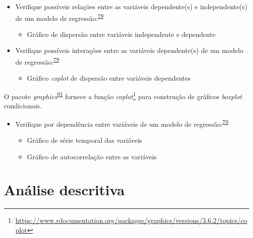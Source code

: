 \documentclass[
  a4paper,
]{book}
\providecommand{\tightlist}{%
  \setlength{\itemsep}{0pt}\setlength{\parskip}{0pt}}
\renewcommand{\href}[2]{#2\footnote{\url{#1}}}
\newenvironment{infobox}[1]
  {
  \begin{itemize}
  \renewcommand{\labelitemi}{
    \raisebox{-.7\height}[0pt][0pt]{
      {\setkeys{Gin}{width=3em,keepaspectratio}
        \texttt{[image: \#1]}}
    }
  }
  \setlength{\fboxsep}{1em}
  \begin{blackbox}
  \item
  }
  {
  \end{blackbox}
  \end{itemize}
  }
\begin{document}
\begin{itemize}
\item
  Verifique possíveis relações entre as variáveis dependente(s) e independente(s) de um modelo de regressão:\textsuperscript{\protect\hyperlink{ref-zuur2009}{79}}

  \begin{itemize}
  \tightlist
  \item
    Gráfico de dispersão entre variáveis independente e dependente
  \end{itemize}
\end{itemize}

\begin{itemize}
\item
  Verifique possíveis interações entre as variáveis dependente(s) de um modelo de regressão:\textsuperscript{\protect\hyperlink{ref-zuur2009}{79}}

  \begin{itemize}
  \tightlist
  \item
    Gráfico \emph{coplot} de dispersão entre variáveis dependentes
  \end{itemize}
\end{itemize}

\begin{infobox}{images/Rlogo}
O pacote \emph{graphics}\textsuperscript{\protect\hyperlink{ref-graphics}{91}} fornece a função \href{https://www.rdocumentation.org/packages/graphics/versions/3.6.2/topics/coplot}{\emph{coplot}} para construção de gráficos \emph{boxplot} condicionais.

\end{infobox}

\begin{itemize}
\item
  Verifique por dependência entre variáveis de um modelo de regressão:\textsuperscript{\protect\hyperlink{ref-zuur2009}{79}}

  \begin{itemize}
  \item
    Gráfico de série temporal das variáveis
  \item
    Gráfico de autocorrelação entre as variáveis
  \end{itemize}
\end{itemize}

\hypertarget{analise-descritiva}{%
\chapter{\texorpdfstring{\textbf{Análise descritiva}}{Análise descritiva}}\label{analise-descritiva}}
\end{document}
